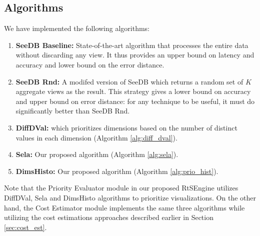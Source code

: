 \subsection{Algorithms}
%
We have implemented the following algorithms:
%
\begin{enumerate}
%
	\item \textbf{SeeDB Baseline:} State-of-the-art algorithm \cite{DBLP:journals/pvldb/VartakMPP14} that processes the entire data without discarding any view. It thus provides an upper bound on latency and accuracy and lower bound on the error distance.
\item \textbf{SeeDB Rnd:} A modifed version of SeeDB which returns a random set of $K$ aggregate views as the result. 
%
This strategy gives a lower bound on accuracy and upper bound on error distance: for any technique to be useful, it must do significantly better than SeeDB Rnd.
%
%
\item \textbf{DiffDVal: } which prioritizes dimensions based on the number of distinct values in each dimension (Algorithm \ref{alg:diff_dval}).
%
\item \textbf{Sela: } Our proposed algorithm (Algorithm \ref{alg:sela}).
%
\item \textbf{DimsHisto: } Our proposed algorithm (Algorithm \ref{alg:prio_hist}).
%
%
\end{enumerate}
%
Note that the Priority Evaluator module in our proposed RtSEngine utilizes DiffDVal, Sela and DimsHisto algorithms to prioritize visualizations. 
%
On the other hand, the Cost Estimator module implements the same three algorithms while utilizing the cost estimations approaches described earlier in Section \ref{sec:cost_est}.
%
